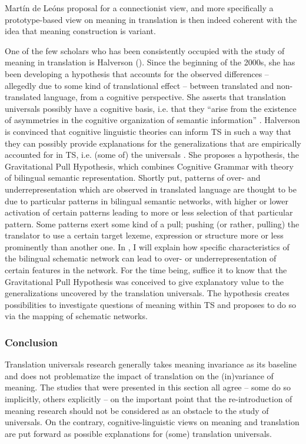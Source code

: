 Martín de Leóns proposal for a connectionist view, and more specifically a prototype-based view on meaning in translation is then indeed coherent with the idea that meaning construction is variant.

One of the few scholars who has been consistently occupied with the study of meaning in translation is Halverson (\citeyear{halverson_cognitive_2003, shreve_cognitive_2010, de_sutter_developing_2017, rojo_implications_2013}). Since the beginning of the 2000s, she has been developing a hypothesis that accounts for the observed differences – allegedly due to some kind of translational effect – between translated and non-translated language, from a cognitive perspective. She asserts that translation universals possibly have a cognitive basis, i.e. that they “arise from the existence of asymmetries in the cognitive organization of semantic information” \citep[197]{halverson_cognitive_2003}. Halverson is convinced that cognitive linguistic theories can inform TS in such a way that they can possibly provide explanations for the generalizations that are empirically accounted for in TS, i.e. (some of) the universals \citep[230]{halverson_cognitive_2003}. She proposes a hypothesis, the Gravitational Pull Hypothesis, which combines  Cognitive Grammar with   theory of bilingual semantic representation. Shortly put, patterns of over- and underrepresentation which are observed in translated language are thought to be due to particular patterns in bilingual semantic networks, with higher or lower activation of certain patterns leading to more or less selection of that particular pattern. Some patterns exert some kind of a pull; pushing (or rather, pulling) the translator to use a certain target lexeme, expression or structure more or less prominently than another one. In , I will explain how specific characteristics of the bilingual schematic network can lead to over- or underrepresentation of certain features in the network. For the time being, suffice it to know that the Gravitational Pull Hypothesis was conceived to give explanatory value to the generalizations uncovered by the translation universals. The hypothesis creates possibilities to investigate questions of meaning within TS and proposes to do so via the mapping of schematic networks. 

\subsubsection{Conclusion}
\label{sec:2.2.3.3}  
Translation universals research generally takes meaning invariance as its baseline and does not problematize the impact of translation on the (in)variance of meaning. The studies that were presented in this section all agree – some do so implicitly, others explicitly – on the important point that the re-introduction of meaning research should not be considered as an obstacle to the study of universals. On the contrary, cognitive-linguistic views on meaning and translation are put forward as possible explanations for (some) translation universals. 

